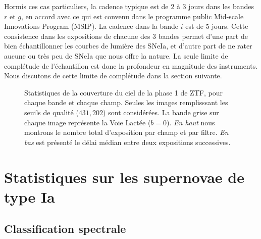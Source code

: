 \documentclass[../main/main.tex]{subfiles}
\begin{document}
Hormis ces cas particuliers, la cadence typique est de $2$ à $3$ jours
dans les bandes $r$ et $g$, en accord avec ce qui est convenu dans le
programme public Mid-scale Innovations Program (MSIP). La cadence dans
la bande $i$ est de $5$ jours. Cette consistence dans les expositions de
chacune des $3$ bandes permet d'une part de bien échantillonner les courbes de
lumière des SNeIa, et d'autre part de ne rater aucune ou très peu de
SNeIa que nous offre la nature. La seule limite de complétude de
l'échantillon est donc la profondeur en magnitude des instruments. Nous
discutons de cette limite de complétude dans la section suivante.

\begin{figure}[ht]
  \centering
  \caption[Statistiques de la couverture du ciel de la phase 1 de
  ZTF.]{Statistiques de la couverture du ciel de la phase 1 de ZTF, pour
    chaque bande et chaque champ. Seules les images remplisssant les
    seuils de qualité ($431,202$) sont considérées. La bande grise sur
    chaque image représente la Voie Lactée ($b=0$). \emph{En haut} nous
    montrons le nombre total d'exposition par champ et par
    filtre. \emph{En bas} est présenté le délai médian entre deux
    expositions successives.}
  \label{fig:skycoverage}
\end{figure}

\section{Statistiques sur les supernovae de type Ia}

\subsection{Classification spectrale}
\end{document}
